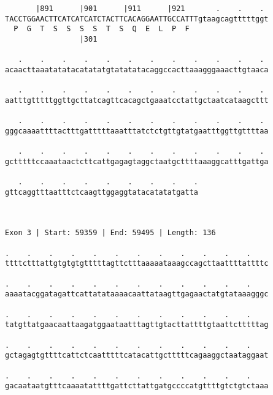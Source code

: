 \documentclass{article}
\begin{document}
\begin{Verbatim}
       |891      |901      |911      |921       .    .    . 
TACCTGGAACTTCATCATCATCTACTTCACAGGAATTGCCATTTgtaagcagtttttggt
  P  G  T  S  S  S  S  T  S  Q  E  L  P  F                  
                 |301                                       
  
   .    .    .    .    .    .    .    .    .    .    .    . 
acaacttaaatatatacatatatgtatatatacaggccacttaaagggaaacttgtaaca
                                                            
   .    .    .    .    .    .    .    .    .    .    .    . 
aatttgtttttggttgcttatcagttcacagctgaaatcctattgctaatcataagcttt
                                                            
   .    .    .    .    .    .    .    .    .    .    .    . 
gggcaaaattttactttgatttttaaatttatctctgttgtatgaatttggttgttttaa
                                                            
   .    .    .    .    .    .    .    .    .    .    .    . 
gctttttccaaataactcttcattgagagtaggctaatgcttttaaaggcatttgattga
                                                            
   .    .    .    .    .    .    .    .    .
gttcaggtttaatttctcaagttggaggtatacatatatgatta
                                            
                                            
 
Exon 3 | Start: 59359 | End: 59495 | Length: 136
 
.    .    .    .    .    .    .    .    .    .    .    .    
ttttctttattgtgtgtgtttttagttctttaaaaataaagccagcttaattttattttc
                                                            
.    .    .    .    .    .    .    .    .    .    .    .    
aaaatacggatagattcattatataaaacaattataagttgagaactatgtataaagggc
                                                            
.    .    .    .    .    .    .    .    .    .    .    .    
tatgttatgaacaattaagatggaataatttagttgtacttattttgtaattctttttag
                                                            
.    .    .    .    .    .    .    .    .    .    .    .    
gctagagtgttttcattctcaatttttcatacattgctttttcagaaggctaataggaat
                                                            
.    .    .    .    .    .    .    .    .    .    .    .    
gacaataatgtttcaaaatattttgattcttattgatgccccatgttttgtctgtctaaa
                                                            

\end{Verbatim}
\end{document}
